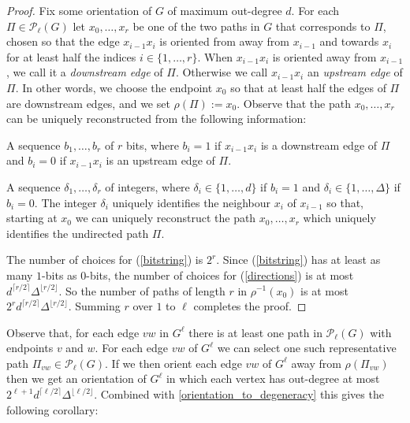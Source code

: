 \documentclass{patmorin}
\newcommand{\defin}[1]{\emph{\color{brightmaroon}#1}}
\begin{document}
\begin{proof}
  Fix some orientation of $G$ of maximum out-degree $d$. For each $\Pi\in\mathcal{P}_\ell(G)$ let $x_0,\ldots,x_r$ be one of the two paths in $G$ that corresponds to $\Pi$, chosen so that the edge $x_{i-1}x_{i}$ is oriented from away from $x_{i-1}$ and towards $x_{i}$ for at least half the indices $i\in\{1,\ldots,r\}$.  When $x_{i-1}x_{i}$ is oriented away from $x_{i-1}$, we call it a \defin{downstream edge} of $\Pi$. Otherwise we call $x_{i-1}x_{i}$ an \defin{upstream edge} of $\Pi$. In other words, we choose the endpoint $x_0$ so that at least half the edges of $\Pi$ are downstream edges, and we set $\rho(\Pi):=x_0$.  Observe that the path $x_0,\ldots,x_r$ can be uniquely reconstructed from the following information:
  \begin{compactenum}[(a)]
    \item A sequence $b_1,\ldots,b_r$ of $r$ bits, where $b_i=1$ if $x_{i-1}x_i$ is a downstream edge of $\Pi$ and $b_i=0$ if $x_{i-1}x_i$ is an upstream edge of $\Pi$.\label{bitstring}
    \item A sequence $\delta_1,\ldots,\delta_r$ of integers, where $\delta_i\in\{1,\ldots,d\}$ if $b_i=1$ and $\delta_i\in\{1,\ldots,\Delta\}$ if $b_i=0$.  The integer $\delta_i$ uniquely identifies the neighbour $x_i$ of $x_{i-1}$ so that, starting at $x_0$ we can uniquely reconstruct the path $x_0,\ldots,x_r$ which uniquely identifies the undirected path $\Pi$.\label{directions}
  \end{compactenum}
  The number of choices for (\ref{bitstring}) is $2^r$.  Since (\ref{bitstring}) has at least as many $1$-bits as $0$-bits, the number of choices for (\ref{directions}) is at most $d^{\lceil r/2\rceil}\Delta^{\lfloor r/2\rfloor}$.  So the number of paths of length $r$ in $\rho^{-1}(x_0)$ is at most $2^rd^{\lceil r/2\rceil}\Delta^{\lfloor r/2\rfloor}$.  Summing $r$ over $1$ to $\ell$ completes the proof.
\end{proof}

Observe that, for each edge $vw$ in $G^{\ell}$ there is at least one path in $\mathcal{P}_\ell(G)$ with endpoints $v$ and $w$.  For each edge $vw$ of $G^{\ell}$ we can select one such representative path $\Pi_{vw}\in\mathcal{P}_\ell(G)$.  If we then orient each edge $vw$ of $G^{\ell}$ away from $\rho(\Pi_{vw})$ then we get an orientation of $G^{\ell}$ in which each vertex has out-degree at most $2^{\ell+1}d^{\lceil \ell/2\rceil}\Delta^{\lfloor\ell/2\rfloor}$.  Combined with \cref{orientation_to_degeneracy} this gives the following corollary:
\end{document}
